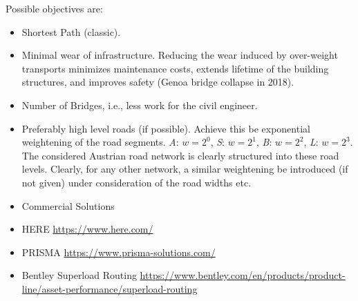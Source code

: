 Possible objectives are:
\begin{itemize}
  \item Shortest Path (classic).

  \item Minimal wear of infrastructure. Reducing the wear induced by over-weight transports
  minimizes maintenance costs, extends lifetime of the building structures, and
  improves safety (Genoa bridge collapse in 2018).
  \citet{Kakan2014}


  \item Number of Bridges, i.e., less work for the civil engineer.
  \item Preferably high level roads (if possible).
  Achieve this be exponential weightening of the road segments.
  \textit{A}: $w=2^0$,    \textit{S}: $w=2^1$,      \textit{B}: $w=2^2$,     \textit{L}: $w=2^3$.
  The considered Austrian road network is clearly structured into these road levels.
  Clearly, for any other network, a similar weightening be introduced
  (if not given) under consideration of the road widths etc.
\end{itemize}

\begin{itemize}





\item Commercial Solutions

\item HERE
\url{https://www.here.com/}
\item PRISMA
\url{https://www.prisma-solutions.com/}

\item Bentley Superload Routing
\url{https://www.bentley.com/en/products/product-line/asset-performance/superload-routing}

\end{itemize}
